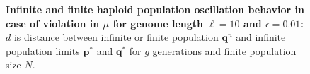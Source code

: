 \begin{figure}[H]
\begin{center}
\hspace{5pt}
\hspace{5pt}


\caption{\textbf{Infinite and finite haploid population oscillation behavior in case of violation in $\mu$ for genome length $\ell = 10$ and $\epsilon = 0.01$:} $d$ is
  distance between infinite or finite population ${\bm q}^n$ and infinite
  population limits ${{\bm p}^\ast}$ and ${{\bm q}^{\ast}}$ for $g$ generations and finite population size $N$.}
\label{oscillation_10h_vio_mu_0.01}
\end{center}
\end{figure}

